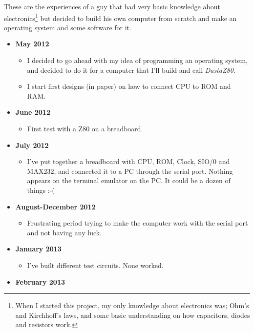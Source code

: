 \documentclass[a4paper,11pt]{article}
\begin{document}
    These are the experiences of a guy that had very basic knowledge about
    electronics\footnote{When I started this project, my only knowledge about
    electronics was; Ohm's and Kirchhoff's laws, and some basic understanding
    on how capacitors, diodes and resistors work.} but decided to build his own
    computer from scratch and make an operating system and some software for it.

    \begin{itemize}
        \item \textbf{May 2012}
        \begin{itemize}
            \item I decided to go ahead with my idea of programming an operating
            system, and decided to do it for a computer that I'll build and call
            \textit{DastaZ80}.
            \item I start first designs (in paper) on how to connect CPU to ROM
            and RAM.
        \end{itemize}
        \item \textbf{June 2012}
        \begin{itemize}
            \item First test with a Z80 on a breadboard.
        \end{itemize}
        \item \textbf{July 2012}
        \begin{itemize}
            \item I've put together a breadboard with CPU, ROM, Clock, SIO/0 and
            MAX232, and connected it to a PC through the serial port. Nothing
            appears on the terminal emulator on the PC. It could be a dozen of
            things :-(
        \end{itemize}
        \item \textbf{August-December 2012}
        \begin{itemize}
            \item Frustrating period trying to make the computer work with the
            serial port and not having any luck.
        \end{itemize}
        \item \textbf{January 2013}
        \begin{itemize}
            \item I've built different test circuits. None worked.
        \end{itemize}
        \item \textbf{February 2013}

\end{itemize}
\end{document}
